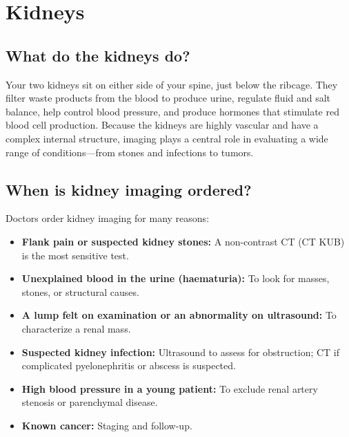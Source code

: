 \chapter{Kidneys}

\label{ch:ch49_kidneys}

\section{What do the kidneys do?}
Your two kidneys sit on either side of your spine, just below the ribcage. They filter waste products from the blood to produce urine, regulate fluid and salt balance, help control blood pressure, and produce hormones that stimulate red blood cell production. Because the kidneys are highly vascular and have a complex internal structure, imaging plays a central role in evaluating a wide range of conditions---from stones and infections to tumors.

\section{When is kidney imaging ordered?}
Doctors order kidney imaging for many reasons:
\begin{itemize}
    \item \textbf{Flank pain or suspected kidney stones:} A non-contrast CT (CT KUB) is the most sensitive test.
    \item \textbf{Unexplained blood in the urine (haematuria):} To look for masses, stones, or structural causes.
    \item \textbf{A lump felt on examination or an abnormality on ultrasound:} To characterize a renal mass.
    \item \textbf{Suspected kidney infection:} Ultrasound to assess for obstruction; CT if complicated pyelonephritis or abscess is suspected.
    \item \textbf{High blood pressure in a young patient:} To exclude renal artery stenosis or parenchymal disease.
    \item \textbf{Known cancer:} Staging and follow-up.
\end{itemize}

